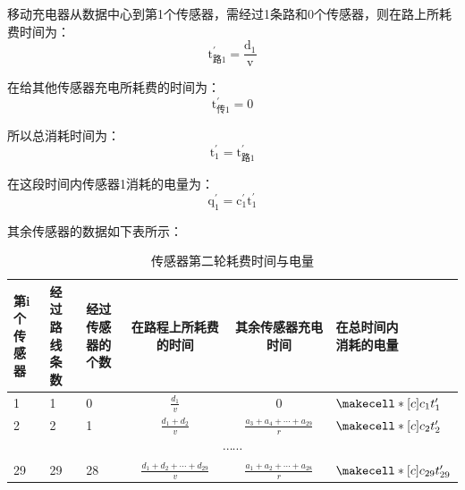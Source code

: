 \documentclass{article}
\begin{document}
移动充电器从数据中心到第1个传感器，需经过1条路和0个传感器，则在路上所耗费时间为：
\begin{equation}
    \mathrm{t_{\text {路1}}^{\prime}=\frac{d_{1}}{v}}
    \tag{15}
\end{equation}

在给其他传感器充电所耗费的时间为：
\begin{equation}
    \mathrm{t_{\text {传1}}^{\prime}=0}
    \tag{16}
\end{equation}

所以总消耗时间为：
\begin{equation}
    \mathrm{t_{1}^{\prime}=t_{\text {路1}}^{\prime}}
    \tag{17}
\end{equation}

在这段时间内传感器1消耗的电量为：
\begin{equation}
    \mathrm{q_{1}^{\prime}=c_{1}^{\prime} t_{1}^{\prime}}
    \tag{18}
\end{equation}

其余传感器的数据如下表所示：
\vspace{1ex}
\begin{table}[h]
    \begin{center} 
        \begin{tabular}{|p{1.5cm}<{\centering}|p{1.5cm}<{\centering}|p{1.5cm}<{\centering}|c|c|p{2cm}<{\centering}|}
        \hline
        \makecell*[c]{第i个\\传感器} & \makecell*[c]{经过路\\线条数} & \makecell*[c]{经过传感\\器的个数}  & 在路程上所耗费的时间            & 其余传感器充电时间             & \makecell*[c]{在总时间内\\消耗的电量}  \\ 
        \hline
        1      & 1     & 0       & $\frac{d_{1}}{v}$ &  0  &  $\makecell*[c]{c_1 t_1^{\prime}}$   \\ 
        \hline
        2      & 2     & 1       & $\frac{d_{1}+d_{2}}{v}$ & $\frac{a_{3}+a_{4}+\cdots+a_{29}}{r}$  &  $\makecell*[c]{c_2 t^{\prime}_2}$  \\ 
        \hline
        \multicolumn{6}{|c|}{$\cdots \cdots$}                                                                 \\ 
        \hline
        29     & 29      & 28        &  $\frac{d_{1}+d_{2}+\cdots+d_{29}}{v}$    &  $\frac{a_{1}+a_{2}+\cdots+a_{28}}{r}$  &  $\makecell*[c]{c_{29} t_{29}^{\prime}}$ \\
        \hline
        \end{tabular}
    \end{center}
\caption{传感器第二轮耗费时间与电量}
\end{table}
\end{document}
